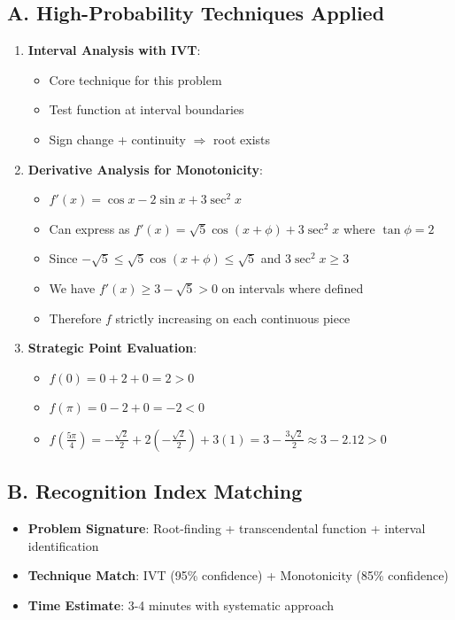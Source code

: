 \documentclass[]{article}
\begin{document}
\begin{techniquesbox}
\subsection*{A. High-Probability Techniques Applied}
\begin{enumerate}[leftmargin=*]
    \item \textbf{Interval Analysis with IVT}: 
    \begin{itemize}
        \item Core technique for this problem
        \item Test function at interval boundaries
        \item Sign change + continuity $\Rightarrow$ root exists
    \end{itemize}
    
    \item \textbf{Derivative Analysis for Monotonicity}:
    \begin{itemize}
        \item $f'(x) = \cos{x} - 2\sin{x} + 3\sec^2{x}$
        \item Can express as $f'(x) = \sqrt{5}\cos(x + \phi) + 3\sec^2{x}$ where $\tan\phi = 2$
        \item Since $-\sqrt{5} \leq \sqrt{5}\cos(x + \phi) \leq \sqrt{5}$ and $3\sec^2{x} \geq 3$
        \item We have $f'(x) \geq 3 - \sqrt{5} > 0$ on intervals where defined
        \item Therefore $f$ strictly increasing on each continuous piece
    \end{itemize}
    
    \item \textbf{Strategic Point Evaluation}:
    \begin{itemize}
        \item $f(0) = 0 + 2 + 0 = 2 > 0$
        \item $f(\pi) = 0 - 2 + 0 = -2 < 0$
        \item $f(\frac{5\pi}{4}) = -\frac{\sqrt{2}}{2} + 2(-\frac{\sqrt{2}}{2}) + 3(1) = 3 - \frac{3\sqrt{2}}{2} \approx 3 - 2.12 > 0$
    \end{itemize}
\end{enumerate}

\subsection*{B. Recognition Index Matching}
\begin{itemize}[leftmargin=*]
    \item \textbf{Problem Signature}: Root-finding + transcendental function + interval identification
    \item \textbf{Technique Match}: IVT (95\% confidence) + Monotonicity (85\% confidence)
    \item \textbf{Time Estimate}: 3-4 minutes with systematic approach
\end{itemize}


\end{techniquesbox}
\end{document}
